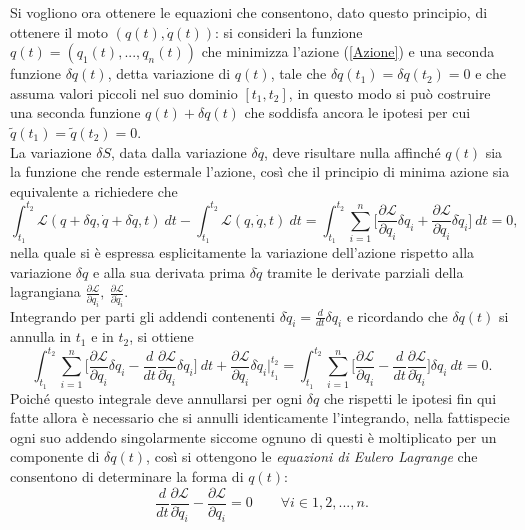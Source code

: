 Si vogliono ora ottenere le equazioni che consentono, dato questo principio, di ottenere il moto $(q(t),\dot{q}(t))$: si consideri la funzione $q(t)=(q_1(t),...,q_n(t))$ che minimizza l'azione (\ref{Azione}) e una seconda funzione $\delta q(t)$, detta variazione di $q(t)$, tale che $\delta q (t_1)=\delta q(t_2)=0$ e che assuma valori piccoli nel suo dominio $[t_1,t_2]$, in questo modo si può costruire una seconda funzione $q(t)+\delta q(t)$ che soddisfa ancora le ipotesi per cui $\tilde{q}(t_1)=\tilde{q}(t_2)=0$.\\
La variazione $\delta S$, data dalla variazione $\delta q$, deve risultare nulla affinché $q(t)$ sia la funzione che rende estermale l'azione, così che il principio di minima azione sia equivalente a richiedere che
\begin{equation}
    \int_{t_1}^{t_2} \mathcal{L}(q+\delta q,\dot{q}+\delta \dot{q},t)\ dt-\int_{t_1}^{t_2} \mathcal{L}(q,\dot{q},t)\ dt=\int_{t_1}^{t_2}\sum_{i=1}^{n}\bigg[\frac{\partial\mathcal{L} }{\partial q_i}\delta q_i+\frac{\partial\mathcal{L} }{\partial \dot{q}_i}\delta \dot{q}_i \bigg]\ dt=0,
\end{equation}
nella quale si è espressa esplicitamente la variazione dell'azione rispetto alla variazione $\delta q$ e alla sua derivata prima $\delta \dot{q}$ tramite le derivate parziali della lagrangiana $\frac{\partial\mathcal{L} }{\partial q_i},\ \frac{\partial\mathcal{L} }{\partial \dot{q}_i}$.\\
Integrando per parti gli addendi contenenti $\delta \dot{q}_i=\frac{d}{dt}\delta q_i$ e ricordando che $\delta q (t)$ si annulla in $t_1$ e in $t_2$, si ottiene
\begin{equation*}
    \int_{t_1}^{t_2}\sum_{i=1}^{n}\bigg[\frac{\partial\mathcal{L} }{\partial q_i}\delta q_i-\frac{d}{dt}\frac{\partial\mathcal{L} }{\partial \dot{q}_i}\delta q_i \bigg]\ dt+\frac{\partial\mathcal{L} }{\partial q_i}\delta \dot{q}_i\bigg|_{t_1}^{t_2}=\int_{t_1}^{t_2}\sum_{i=1}^{n}\bigg[\frac{\partial\mathcal{L} }{\partial q_i}-\frac{d}{dt}\frac{\partial\mathcal{L} }{\partial \dot{q}_i} \bigg]\delta q_i\ dt=0.
\end{equation*}
Poiché questo integrale deve annullarsi per ogni $\delta q$ che rispetti le ipotesi fin qui fatte allora è necessario che si annulli identicamente l'integrando, nella fattispecie ogni suo addendo singolarmente siccome ognuno di questi è moltiplicato per un componente di $\delta q(t)$, così si ottengono le \emph{equazioni di Eulero Lagrange} che consentono di determinare la forma di $q(t)$:
\begin{equation}
    \label{eulero-lagrange}
    \frac{d}{dt}\frac{\partial\mathcal{L} }{\partial \dot{q}_i}-\frac{\partial\mathcal{L} }{\partial q_i}=0 \qquad \forall i\in{1,2,...,n}.
\end{equation}
